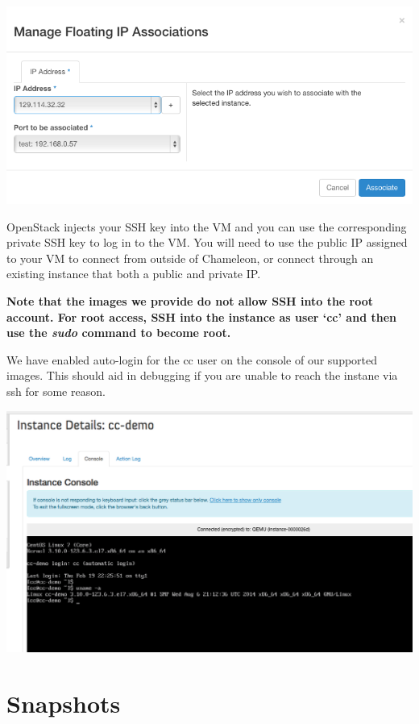 \includegraphics[width=\columnwidth]{images/chameleon/openstack_alamo_floating.png}

OpenStack injects your SSH key into the VM and you can use the
corresponding private SSH key to log in to the VM. You will need to use
the public IP assigned to your VM to connect from outside of Chameleon,
or connect through an existing instance that both a public and private
IP.

\textbf{Note that the images we provide do not allow SSH into the root
account. For root access, SSH into the instance as user `cc' and then
use the \emph{sudo} command to become root.}

We have enabled auto-login for the cc user on the console of our
supported images. This should aid in debugging if you are unable to
reach the instane via ssh for some reason.

\includegraphics[width=\columnwidth]{images/chameleon/openstack_alamo_console.png}

\section{Snapshots}\label{snapshots}

